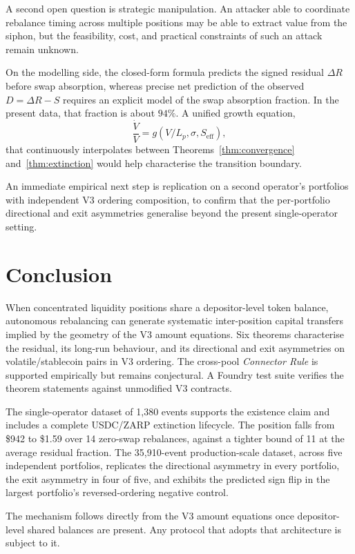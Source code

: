 \documentclass{manuscript}
\begin{document}
A second open question is strategic manipulation. An attacker able to coordinate rebalance timing across multiple positions may be able to extract value from the siphon, but the feasibility, cost, and practical constraints of such an attack remain unknown.

On the modelling side, the closed-form formula predicts the signed residual $\Delta R$ before swap absorption, whereas precise net prediction of the observed $D = \Delta R - S$ requires an explicit model of the swap absorption fraction. In the present data, that fraction is about $94\%$. A unified growth equation,
\[
\frac{\dot V}{V} = g(V/L_p, \sigma, S_{\text{eff}}),
\]
that continuously interpolates between Theorems~\ref{thm:convergence} and~\ref{thm:extinction} would help characterise the transition boundary.

An immediate empirical next step is replication on a second operator's portfolios with independent V3 ordering composition, to confirm that the per-portfolio directional and exit asymmetries generalise beyond the present single-operator setting.

\section{Conclusion}\label{sec:conclusion}

When concentrated liquidity positions share a depositor-level token balance, autonomous rebalancing can generate systematic inter-position capital transfers implied by the geometry of the V3 amount equations. Six theorems characterise the residual, its long-run behaviour, and its directional and exit asymmetries on volatile/stablecoin pairs in V3 ordering. The cross-pool \emph{Connector Rule} is supported empirically but remains conjectural. A Foundry test suite verifies the theorem statements against unmodified V3 contracts.

The single-operator dataset of 1{,}380 events supports the existence claim and includes a complete USDC/ZARP extinction lifecycle. The position falls from \$942 to \$1.59 over 14 zero-swap rebalances, against a tighter bound of 11 at the average residual fraction. The 35{,}910-event production-scale dataset, across five independent portfolios, replicates the directional asymmetry in every portfolio, the exit asymmetry in four of five, and exhibits the predicted sign flip in the largest portfolio's reversed-ordering negative control.

The mechanism follows directly from the V3 amount equations once depositor-level shared balances are present. Any protocol that adopts that architecture is subject to it.
\end{document}
